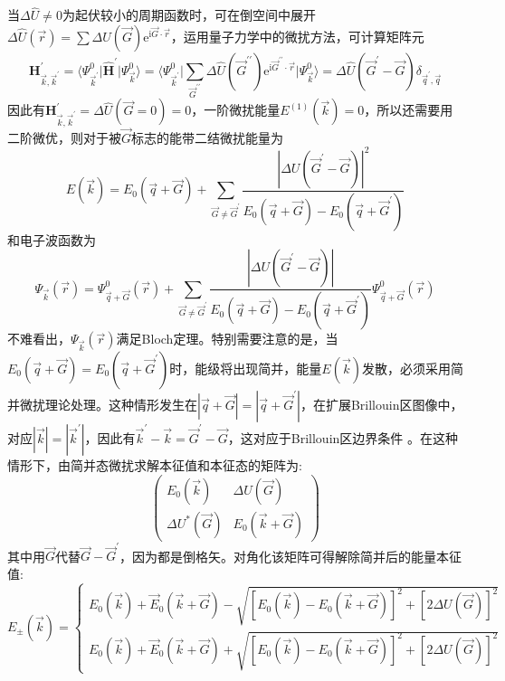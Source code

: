 当$\Delta\hat{U}\neq0$为起伏较小的周期函数时，可在倒空间中展开$\Delta\hat{U}(\vec r)=\sum\Delta U(\vec G)\mathrm{e}^{\mathrm{i}\vec G\cdot\vec r}$，运用量子力学中的微扰方法，可计算矩阵元
\begin{displaymath}
	{\mathbf{H}}_{\vec k,\vec k^{\prime}}^{\prime}=\bigg\langle\Psi_{\vec k^{\prime}}^0\bigg|\hat{\mathbf H}^{\prime}\bigg|\Psi_{\vec k}^0\bigg\rangle=\bigg\langle\Psi_{\vec k^{\prime}}^0\bigg|\sum_{\vec G^{\prime\prime}}\Delta\hat{U}(\vec G^{\prime\prime})\mathrm{e}^{\mathrm{i}\vec G^{\prime\prime}\cdot\vec r}\bigg|\Psi_{\vec k}^0\bigg\rangle=\Delta\hat{U}(\vec G^{\prime}-\vec G)\delta_{\vec q^{\prime},\vec q}
\end{displaymath} 
因此有$\mathbf{H}_{\vec k,\vec k^{\prime}}^{\prime}=\Delta\hat{U}(\vec G=0)=0$，一阶微扰能量$E^{(1)}(\vec k)=0$，所以还需要用二阶微优，则对于被$\vec G$标志的能带二结微扰能量为
\begin{equation}
	E(\vec k)=E_0(\vec q+\vec G)+\sum_{\vec G\neq\vec G^{\prime}}\dfrac{|\Delta U(\vec G^{\prime}-\vec G)|^2}{E_0(\vec q+\vec G)-E_0(\vec q+\vec G^{\prime})}
	\label{eq:Electron-energy-p-2order}
\end{equation}
和电子波函数为
\begin{equation}
	\Psi_{\vec k}(\vec r)=\Psi_{\vec q+\vec G}^0(\vec r)+\sum_{\vec G\neq\vec G^{\prime}}\dfrac{|\Delta U(\vec G^{\prime}-\vec G)|}{E_0(\vec q+\vec G)-E_0(\vec q+\vec G^{\prime})}\Psi_{\vec q+\vec G}^0(\vec r)
	\label{eq:Electron-Wave-p-2order}
\end{equation}
不难看出，$\Psi_{\vec k}(\vec r)$满足Bloch定理。特别需要注意的是，当$E_0(\vec q+\vec G)=E_0(\vec q+\vec G^{\prime})$时，能级将出现简并，能量$E(\vec k)$发散，必须采用简并微扰理论处理。这种情形发生在$|\vec q+\vec G|=|\vec q+\vec G^{\prime}|$，在扩展Brillouin区图像中，对应$|\vec k|=|\vec k^{\prime}|$，因此有$\vec k^{\prime}-\vec k=\vec G^{\prime}-\vec G$，这对应于Brillouin区边界条件%
。在这种情形下，由简并态微扰求解本征值和本征态的矩阵为:
\begin{displaymath}
	\begin{pmatrix}
		E_0(\vec k) &\Delta U(\vec G)\\
		\Delta U^{\ast}(\vec G) &E_0(\vec k+\vec G)
	\end{pmatrix}
\end{displaymath} 
其中用$\vec G$代替$\vec G-\vec G^{\prime}$，因为都是倒格矢。对角化该矩阵可得解除简并后的能量本征值: 
\begin{equation}
	E_{\pm}(\vec k)=\left\{
		\begin{aligned}
			E_0(\vec k)+\vec E_0(\vec k+\vec G)-\sqrt{[E_0(\vec k)-E_0(\vec k+\vec G)]^2+[2\Delta U(\vec G)]^2}\\
			E_0(\vec k)+\vec E_0(\vec k+\vec G)+\sqrt{[E_0(\vec k)-E_0(\vec k+\vec G)]^2+[2\Delta U(\vec G)]^2}
		\end{aligned}\right.
	\label{eq:degenerate-per-2order}
\end{equation}
